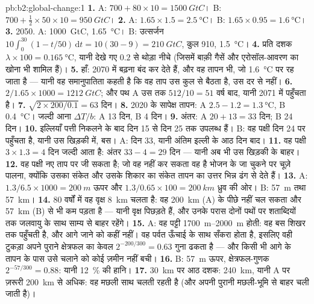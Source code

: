 \begin{solution}{pb:b2:global-change:1}
\textbf{1.} A: $700 + 80\times 10 = \qty{1500}{GtC}$। B: $700 +
\tfrac12\times 50\times 10 = \qty{950}{GtC}$।
\textbf{2.} A: $1.65\times 1.5 = \qty{2.5}{\celsius}$। B:
$1.65\times 0.95 = \qty{1.6}{\celsius}$।
\textbf{3.} 2050. A: \qty{1000}{GtC}, \qty{1.65}{\celsius}। B:
उत्सर्जन $10\int_0^{30}(1 - t/50)\,\mathrm{d}t = 10(30 - 9) =
\qty{210}{GtC}$, कुल 910, \qty{1.5}{\celsius}।
\textbf{4.} प्रति दशक $\lambda\times 100 = \qty{0.165}{\celsius}$,
यानी देखे गए $0.2$ से थोड़ा नीचे (जिसमें बाक़ी गैसें
और एरोसॉल-आवरण का खोना भी शामिल हैं)।
\textbf{5.} हाँ:  2070 में बढ़ना बंद कर देते हैं, और वह
तापन भी, जो \qty{1.6}{\celsius} पर रह जाता है --- यानी वह
समानुपातिता कहती है कि वह ताप उस कुल से बैठता है, उस
दर से नहीं।
\textbf{6.} $2/1.65\times 1000 = \qty{1212}{GtC}$; और पथ A उस तक
$512/10 = 51$ वर्ष बाद, यानी 2071 में पहुँचता है।
\textbf{7.} $\sqrt{2\times 200/0.1} = 63$ दिन।
\textbf{8.} 2020 के सापेक्ष तापन: A $2.5 - 1.2 =
\qty{1.3}{\celsius}$, B \qty{0.4}{\celsius}। जल्दी आना $\Delta T/b$:
A 13 दिन, B 4 दिन।
\textbf{9.} अंतर: A $20 + 13 = 33$ दिन; B 24 दिन।
\textbf{10.} इल्लियाँ पत्ती निकलने के बाद दिन 15 से दिन 25 तक
उपलब्ध हैं। B: वह पक्षी दिन 24 पर पहुँचता है, यानी उस खिड़की में, बस।
A: दिन 33, यानी अंतिम इल्ली के आठ दिन बाद।
\textbf{11.} वह पक्षी $3\times 1.3 = 4$ दिन जल्दी आता है: अंतर $33 - 4 =
29$ दिन --- यानी अब भी उस खिड़की के बाहर।
\textbf{12.} वह पक्षी नए ताप पर जी सकता है; जो वह नहीं
कर सकता वह है भोजन के जा चुकने पर चूज़े पालना, क्योंकि उसका संकेत
और उसके शिकार का संकेत तापन का उत्तर भिन्न ढंग से देते हैं।
\textbf{13.} A: $1.3/6.5\times 1000 = \qty{200}{m}$ ऊपर और
$1.3/0.65\times 100 = \qty{200}{km}$ ध्रुव की ओर। B: \qty{57}{m} तथा
\qty{57}{km}।
\textbf{14.} 80 वर्षों में वह वृक्ष \qty{8}{km} चलता है: वह
\qty{200}{km} (A) के पीछे नहीं चल सकता और \qty{57}{km} (B) से भी कम पड़ता है ---
यानी वृक्ष पिछड़ते हैं, और उनके परास दोनों पथों पर शताब्दियों तक
जलवायु के साथ साम्य से बाहर रहेंगे।
\textbf{15.} A: वह पट्टी \qtyrange{1700}{2000}{m} होती: वह
बस शिखर तक पहुँचती है, और आगे जाने को कहीं नहीं। वह पर्वत ऊँचाई के साथ
सँकरा होता है, इसलिए वही टुकड़ा अपने पुराने क्षेत्रफल का केवल $2^{-200/300} = 0.63$ गुना
ढकता है --- और किसी भी आगे के तापन के पास उसे चलाने को कोई ज़मीन नहीं बची।
\textbf{16.} B: \qty{57}{m} ऊपर, क्षेत्रफल-गुणक $2^{-57/300} = 0.88$: यानी
\qty{12}{\%} की हानि।
\textbf{17.} \qty{30}{km} पर आठ दशक: \qty{240}{km}, यानी A पर ज़रूरी
\qty{200}{km} से अधिक: वह मछली साथ चलती रहती है (और अपनी पुरानी
मछली-भूमि से बाहर चली जाती है)।

\end{solution}
